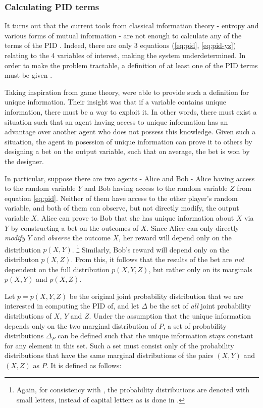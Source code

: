 \documentclass[12pt]{article}
\begin{document}
\subsubsection{Calculating PID terms}

It turns out that the current tools from classical information theory - entropy and various forms of mutual information - are not enough to calculate any of the terms of the PID \cite{williams-beer}. Indeed, there are only 3 equations (\ref{eq:pid}, \ref{eq:pid-yz}) relating to the 4 variables of interest, making the system underdetermined. In order to make the problem tractable, a definition of at least one of the PID terms must be given \cite{bertschinger}.

Taking inspiration from game theory, \cite{bertschinger} were able to provide such a definition for unique information. Their insight was that if a variable contains unique information, there must be a way to exploit it. In other words, there must exist a situation such that an agent having access to unique information has an advantage over another agent who does not possess this knowledge. Given such a situation, the agent in posession of unique information can prove it to others by designing a bet on the output variable, such that on average, the bet is won by the designer.

In particular, suppose there are two agents - Alice and Bob - Alice having access to the random variable $Y$ and Bob having access to the random variable $Z$ from equation \ref{eq:pid}. Neither of them have access to the other player's random variable, and both of them can observe, but not directly modify, the output variable $X$. Alice can prove to Bob that she has unique information about $X$ via $Y$ by constructing a bet on the outcomes of $X$. Since Alice can only directly \textit{modify} $Y$ and \textit{observe} the outcome $X$, her reward will depend only on the distribution $p(X,Y)$. \footnote{Again, for consistency with \cite{cover-thomas}, the probability distributions are denoted with small letters, instead of capital letters as is done in \cite{bertschinger}.} Similarly, Bob's reward will depend only on the distributon $p(X,Z)$. From this, it follows that the results of the bet are \textit{not} dependent on the full distribution $p(X,Y,Z)$, but rather only on its marginals $p(X,Y)$ and $p(X,Z)$.

Let $p = p(X,Y,Z)$ be the original joint probability distribution  that we are interested in computing the PID of, and let $\Delta$ be the set of \textit{all} joint probability distributions of $X$, $Y$ and $Z$. Under the assumption that the unique information depends only on the two marginal distribution of $P$, a set of probability distributions $\Delta_P$ can be defined such that the unique information stays constant for any element in this set. Such a set must consist only of the probability distributions that have the same marginal distributions of the pairs $(X,Y)$ and $(X,Z)$ as $P$. It is defined as follows: 
\end{document}

